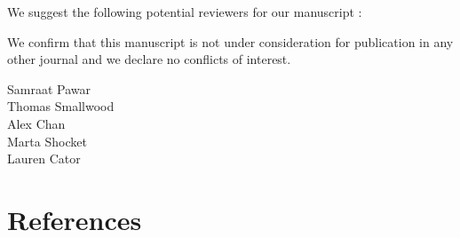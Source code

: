 \documentclass[blank]{impletter}
\begin{document}
We suggest the following potential reviewers for our manuscript
:


We confirm that this manuscript is not under consideration for publication in any other journal and we declare no conflicts of interest. 

{
\vspace{-40pt}

Samraat Pawar\\
Thomas Smallwood\\
Alex Chan\\ 
Marta Shocket\\
Lauren Cator\\
}

\section*{References}
\vspace{-40pt}


\end{document}
